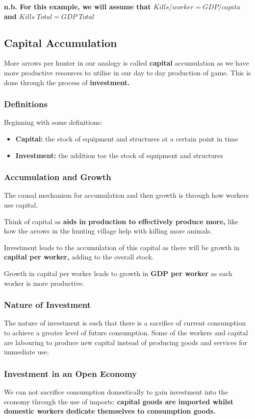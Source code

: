 \documentclass[12pt, letterpaper]{article}
\begin{document}
\textbf{n.b. For this example, we will assume that $Kills/worker = GDP/capita$ and $Kills \; Total = GDP \; Total$}

\subsection{Capital Accumulation}
More arrows per hunter in our analogy is called \textbf{capital} accumulation as we have more productive resources to utilise in our day to day production of game. This is done through the process of \textbf{investment.}

\subsubsection{Definitions}
Beginning with some definitions:
\begin{itemize}
	\item \textbf{Capital:} the stock of equipment and structures at a certain point in time
	\item \textbf{Investment:} the addition toe the stock of equipment and structures
\end{itemize}

\subsubsection{Accumulation and Growth}
The causal mechanism for accumulation and then growth is through how workers use capital. 

Think of capital as \textbf{aids in production to effectively produce more,} like how the arrows in the hunting village help with killing more animals. 

Investment leads to the accumulation of this capital as there will be growth in \textbf{capital per worker,} adding to the overall stock. 

Growth in capital per worker leads to growth in \textbf{GDP per worker} as each worker is more productive.

\subsubsection{Nature of Investment}
The nature of investment is such that there is a sacrifice of current consumption to achieve a greater level of future consumption. Some of the workers and capital are labouring to produce new capital instead of producing goods and services for immediate use.

\subsubsection{Investment in an Open Economy}
We can not sacrifice consumption domestically to gain investment into the economy through the use of imports: \textbf{capital goods are imported whilst domestic workers dedicate themselves to consumption goods.}
\end{document}
